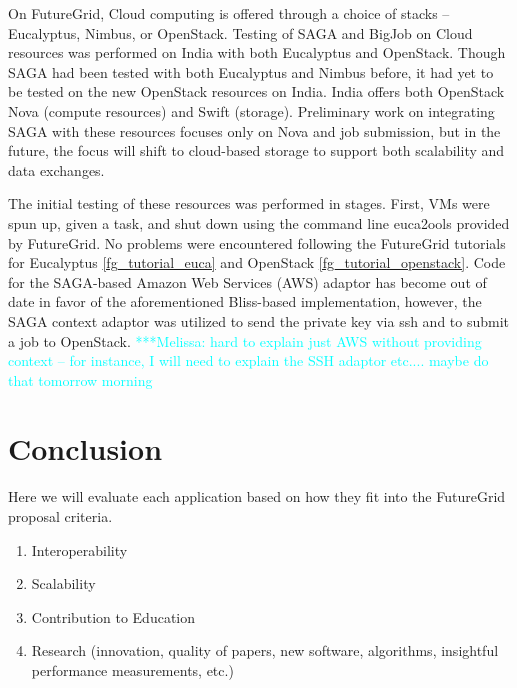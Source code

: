\documentclass[]{paper}
\newcommand{\mrnote}[1]{ {\textcolor{cyan} { ***Melissa: #1 }}}
\newcommand{\mrnote}[1]{}
\begin{document}
On FutureGrid, Cloud computing is offered through a choice of stacks -- Eucalyptus, Nimbus, or OpenStack. Testing of SAGA and BigJob on Cloud resources was performed on India with both Eucalyptus and OpenStack. Though SAGA had been tested with both Eucalyptus and Nimbus before, it had yet to be tested on the new OpenStack resources on India. India offers both OpenStack Nova (compute resources) and Swift (storage). Preliminary work on integrating SAGA with these resources focuses only on Nova and job submission, but in the future, the focus will shift to cloud-based storage to support both scalability and data exchanges.

The initial testing of these resources was performed in stages. First, VMs were spun up, given a task, and shut down using the command line euca2ools provided by FutureGrid. No problems were encountered following the FutureGrid tutorials for Eucalyptus \ref{fg_tutorial_euca} and OpenStack \ref{fg_tutorial_openstack}. Code for the SAGA-based Amazon Web Services (AWS) adaptor has become out of date in favor of the aforementioned Bliss-based implementation, however, the SAGA context adaptor was utilized to send the private key via ssh and to submit a job to OpenStack. \mrnote{hard to explain just AWS without providing context -- for instance, I will need to explain the SSH adaptor etc.... maybe do that tomorrow morning}

\section{Conclusion}
Here we will evaluate each application based on how they fit into the
FutureGrid proposal criteria.
\begin{enumerate}
\item Interoperability
\item Scalability
\item Contribution to Education
\item Research (innovation, quality of papers, new software, algorithms, insightful performance measurements, etc.)

\end{enumerate}



\end{document}
